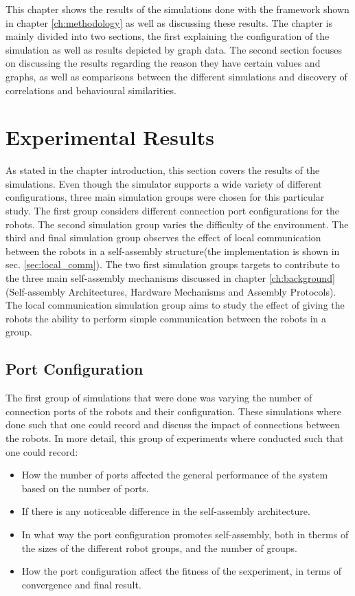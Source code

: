 This chapter shows the results of the simulations done with the framework shown in chapter \ref{ch:methodology} as well as discussing these results.
The chapter is mainly divided into two sections, the first explaining the configuration of the simulation as well as results depicted by graph data.
The second section focuses on discussing the results regarding the reason they have certain values and graphs, as well as comparisons between the different simulations and discovery of correlations and behavioural similarities.

\section{Experimental Results}
As stated in the chapter introduction, this section covers the results of the simulations. 
Even though the simulator supports a wide variety of different configurations, three main simulation groups were chosen for this particular study.
The first group considers different connection port configurations for the robots.
The second simulation group varies the difficulty of the environment.
The third and final simulation group observes the effect of local communication between the robots in a self-assembly structure(the implementation is shown in sec. \ref{sec:local_comm}).
The two first simulation groups targets to contribute to the three main self-assembly mechanisms discussed in chapter \ref{ch:background}(Self-assembly Architectures, Hardware Mechanisms and Assembly Protocols).
The local communication simulation group aims to study the effect of giving the robots the ability to perform simple communication between the robots in a group.

\subsection{Port Configuration}
The first group of simulations that were done was varying the number of connection ports of the robots and their configuration.
These simulations where done such that one could record and discuss the impact of connections between the robots.
In more detail, this group of experiments where conducted such that one could record:

\begin{itemize}
	\item How the number of ports affected the general performance of the system based on the number of ports.
	\item If there is any noticeable difference in the self-assembly architecture.
	\item In what way the port configuration promotes self-assembly, both in therms of the sizes of the different robot groups, and the number of groups.
	\item How the port configuration affect the fitness of the sexperiment, in terms of convergence and final result.
\end{itemize}

